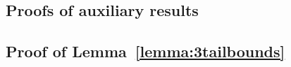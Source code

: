 \documentclass[aos]{imsart}
\theoremstyle{plain}
\begin{document}
\begin{supplement}




\section{Proofs of auxiliary results}\label{sec:proofauxi}

\subsection{Proof of Lemma~\ref{lemma:3tailbounds}}


\end{supplement}
\end{document}
